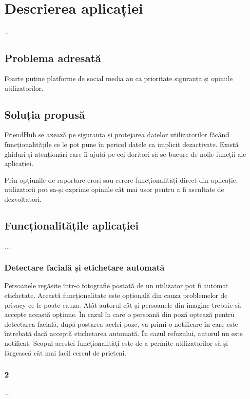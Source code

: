 \chapter{Descrierea aplicației}
...
    \section{Problema adresată}
    \label{Problema adresată}
    Foarte puține platforme de social media au ca prioritate siguranța și opiniile utilizatorilor.
    
    \section{Soluția propusă}
    \label{Soluția propusă}
    FriendHub se axează pe siguranța și protejarea datelor utilizatorilor făcând funcționalitățile ce le pot pune în pericol datele ca implicit dezactivate. Există ghiduri și atenționări care îi ajută pe cei doritori să se bucure de noile funcții ale aplicației.
    
    Prin opțiunile de raportare erori sau cerere funcționalități direct din aplicație, utilizatorii pot sa-și exprime opiniile cât mai ușor pentru a fi ascultate de dezvoltatori.
    \section{Funcționalitățile aplicației}
    \label{Funcționalitățile aplicației}
    ...
        \subsection{Detectare facială și etichetare automată}
        \label{Funcționalitățile aplicației 1}
        Persoanele regăsite într-o fotografie postată de un utilizator pot fi automat etichetate. Această funcționalitate este opțională din cauza problemelor de privacy ce le poate cauza. Atât autorul cât și persoanele din imagine trebuie să accepte această opțiune. În cazul în care o persoană din poză optează pentru detectarea facială, după postarea acelei poze, va primi o notificare în care este întrebată dacă acceptă etichetarea automată. În cazul refuzului, autorul nu este notificat. Scopul acestei funcționalități este de a permite utilizatorilor să-și lărgească cât mai facil cercul de prieteni.
        \subsection{2}
        \label{Funcționalitățile aplicației 2}
        ...

